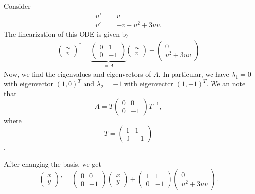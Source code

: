\documentclass{article}
\begin{document}
    \begin{example}{}
        Consider 
        \begin{align*}
            u' &= v\\
            v' &= -v + u^2 + 3uv.
        \end{align*}
        The linearization of this ODE is given by 
        \begin{align*}
            \begin{pmatrix}
                u \\ v
            \end{pmatrix}^* = 
            \underbrace{
                \begin{pmatrix}
                    0 & 1 \\
                    0 & -1
                \end{pmatrix}}_{=A}
            \begin{pmatrix}
                u \\ v
            \end{pmatrix}
            + 
            \begin{pmatrix}
                0 \\
                u^2 + 3uv    
            \end{pmatrix}
        \end{align*}
        Now, we find the eigenvalues and eigenvectors of $A$. In particular, we have $\lambda_1 = 0$ with eigenvector $(1, 0)^T$ and $\lambda_2 = -1$ with eigenvector $(1, -1)^T$. We an note that 
        \[
            A = T
            \begin{pmatrix}
                0 & 0 \\
                0 & -1
            \end{pmatrix}
            T^{-1},
        \]
        where 
        \[
            T = 
            \begin{pmatrix}
                1 & 1 \\
                0 & -1    
            \end{pmatrix}
        \].

        After changing the basis, we get 
        \[
            \begin{pmatrix}
                x \\
                y
            \end{pmatrix}' = 
            \begin{pmatrix}
                0 & 0 \\
                0 & -1
            \end{pmatrix}
            \begin{pmatrix}
                x \\ y 
            \end{pmatrix} + 
            \begin{pmatrix}
                1 & 1 \\
                0 & -1 
            \end{pmatrix}
            \begin{pmatrix}
                0 \\
                u^2 + 3uv
            \end{pmatrix}.
        \]


\end{example}
\end{document}
